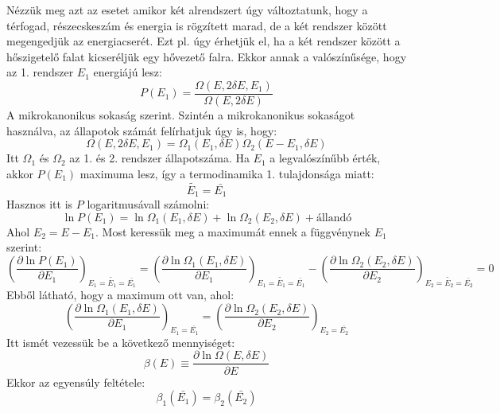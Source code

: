 \documentclass[../main.tex]{subfiles}
\begin{document}
Nézzük meg azt az esetet amikor két alrendszert úgy változtatunk, hogy a térfogad, részecskeszám és energia is rögzített marad, de a két rendszer között megengedjük az energiacserét.
Ezt pl. úgy érhetjük el, ha a két rendszer között a hőszigetelő falat kicseréljük egy hővezető falra. Ekkor annak a valószínűsége, hogy az 1. rendszer $E_1$ energiájú lesz:
\begin{equation}
    P(E_1) = \frac{\Omega(E, 2\delta E, E_1)}{\Omega(E, 2\delta E)}
\end{equation}
A mikrokanonikus sokaság szerint. Szintén a mikrokanonikus sokaságot használva, az állapotok számát felírhatjuk úgy is, hogy:
\begin{equation}
    \Omega(E, 2\delta E, E_1) = \Omega_1(E_1, \delta E) \Omega_2(E - E_1, \delta E)
\end{equation}
Itt $\Omega_1$ és $\Omega_2$ az 1. és 2. rendszer állapotszáma. Ha $E_1$ a legvalószínűbb érték, akkor $P(E_1)$ maximuma lesz, így a termodinamika 1. tulajdonsága miatt:
\begin{equation}
    \tilde{E_1} = \bar{E_1}
\end{equation}
Hasznos itt is $P$ logaritmusávall számolni:
\begin{equation}
    \ln P(E_1) = \ln \Omega_1(E_1, \delta E) + \ln \Omega_2(E_2, \delta E) + \text{állandó}
\end{equation}
Ahol $E_2 = E - E_1$. Most keressük meg a maximumát ennek a függvénynek $E_1$ szerint:
\begin{equation}
    \left(\frac{\partial \ln P(E_1)}{\partial E_1}\right)_{E_1 = \tilde{E_1} = \bar{E_1}} = \left( \frac{\partial \ln \Omega_1(E_1, \delta E)}{\partial E_1} \right)_{E_1 = \tilde{E_1} = \bar{E_1}} - \left( \frac{\partial \ln \Omega_2(E_2, \delta E)}{\partial E_2} \right)_{E_2 = \tilde{E_2} = \bar{E_2}} = 0
\end{equation}
Ebből látható, hogy a maximum ott van, ahol:
\begin{equation}
    \left( \frac{\partial \ln \Omega_1(E_1, \delta E)}{\partial E_1} \right)_{E_1 = \bar{E_1}} = \left( \frac{\partial \ln \Omega_2(E_2, \delta E)}{\partial E_2} \right)_{E_2 = \bar{E_2}}
\end{equation}
Itt ismét vezessük be a következő mennyiséget:
\begin{equation}
    \beta(E) \equiv \frac{\partial \ln \Omega(E, \delta E)}{\partial E}
\end{equation}
Ekkor az egyensúly feltétele:
\begin{equation}
    \beta_1(\bar{E_1}) = \beta_2(\bar{E_2})
\end{equation}
\end{document}
